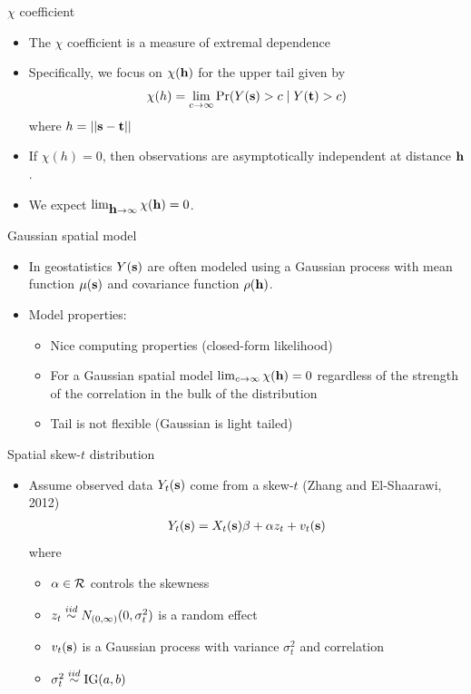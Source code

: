 \documentclass{beamer}
\begin{document}
\begin{frame}{$\chi$ coefficient}
  \begin{itemize} \setlength{\itemsep}{0.5em}
   \item The $\chi$ coefficient is a measure of extremal dependence
   \item Specifically, we focus on $\chi(\mbox{\bf h})$ for the upper tail given by
    \begin{align*}
      \chi(h) = \lim_{c \rightarrow \infty}\Pr(Y(\mbox{\bf s}) > c \mid Y(\mbox{\bf t}) > c)
    \end{align*}
    where $h = ||\mbox{\bf s} - \mbox{\bf t}||$
    \item If $ \chi(h) = 0$, then observations are asymptotically independent at distance $\mbox{\bf h}$.
    \item We expect $\lim_{\mbox{\bf h} \rightarrow \infty}\chi(\mbox{\bf h})=0$.
  \end{itemize}
\end{frame}

\begin{frame}{Gaussian spatial model}
  \begin{itemize} \setlength{\itemsep}{0.5em}
    \item In geostatistics $Y(\mbox{\bf s})$ are often modeled using a Gaussian process with mean function $\mu(\mbox{\bf s})$ and covariance function
$\rho(\mbox{\bf h})$.
    \item Model properties:
    \begin{itemize}
      \item Nice computing properties (closed-form likelihood)
    \item For a Gaussian spatial model $\lim_{c \rightarrow \infty} \chi(\mbox{\bf h}) = 0$ regardless of the strength of the correlation in the bulk of the distribution
    \item Tail is not flexible (Gaussian is light tailed)
    \end{itemize}
    \end{itemize}
\end{frame}

\begin{frame}{Spatial skew-$t$ distribution}
  \begin{itemize} \setlength{\itemsep}{0.5em}
    \item Assume observed data $Y_t(\mbox{\bf s})$ come from a skew-$t$ (Zhang and El-Shaarawi, 2012)
    \begin{align*}
      Y_t(\mbox{\bf s}) = X_t(\mbox{\bf s})\beta + \alpha z_t + v_t(\mbox{\bf s})
    \end{align*}
    where
    \begin{itemize} \setlength{\itemsep}{0.25em}
      \item $\alpha \in {\cal R}$ controls the skewness
      \item $z_t \stackrel{iid}{\sim} N_{(0, \infty)}(0, \sigma^2_t)$ is a random effect
      \item $v_t(\mbox{\bf s})$ is a Gaussian process with variance $\sigma^2_t$ and \Matern correlation
      \item $\sigma_t^2 \stackrel{iid}{\sim} \text{IG}(a, b)$
    \end{itemize}
  \end{itemize}
\end{frame}
\end{document}
